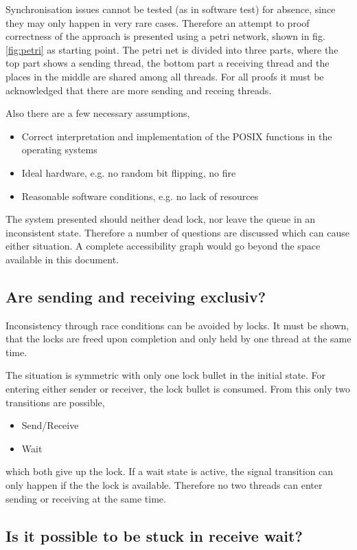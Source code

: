 \documentclass[12pt]{article}
\begin{document}
Synchronisation issues cannot be tested (as in software test) for absence, since they may only
happen in very rare cases.
Therefore an attempt to proof correctness of the approach is presented using a petri network, shown
in fig. \ref{fig:petri} as starting point. The petri net is divided into three parts,
where the top part shows a sending thread, the bottom part a receiving thread and the places
in the middle are shared among all threads. For all proofs it must be acknowledged that there
are more sending and receing threads.

Also there are a few necessary assumptions,
\begin{itemize}
 \item Correct interpretation and implementation of the POSIX functions in the operating systems
 \item Ideal hardware, e.g. no random bit flipping, no fire
 \item Reasonable software conditions, e.g. no lack of resources
\end{itemize}

The system presented should neither dead lock, nor leave the queue in an inconsistent state.
Therefore a number of questions are discussed which can cause either situation.
A complete accessibility graph would go beyond the space available in this document.

\subsection{Are sending and receiving exclusiv?}

Inconsistency through race conditions can be avoided by locks.
It must be shown, that the locks are freed upon completion and only
held by one thread at the same time.

The situation is symmetric with only one lock bullet in the initial state.
For entering either sender or receiver, the lock bullet is consumed.
From this only two transitions are possible,
\begin{itemize}
 \item Send/Receive
 \item Wait
\end{itemize}
which both give up the lock.
If a wait state is active, the signal transition can only happen if the
the lock is available. Therefore no two threads can enter sending or
receiving at the same time.

\subsection{Is it possible to be stuck in receive wait?}
\end{document}
